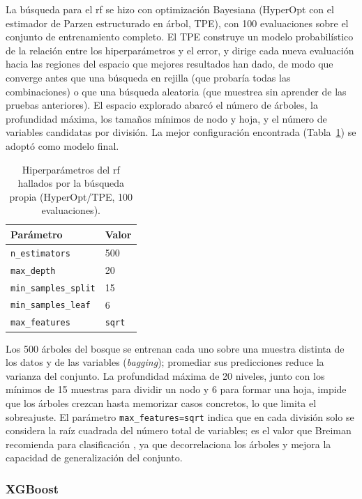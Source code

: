 La búsqueda para el \acrlong{rf} se hizo con optimización Bayesiana (HyperOpt con el estimador de Parzen estructurado en árbol, TPE), con 100 evaluaciones sobre el conjunto de entrenamiento completo. El TPE construye un modelo probabilístico de la relación entre los hiperparámetros y el error, y dirige cada nueva evaluación hacia las regiones del espacio que mejores resultados han dado, de modo que converge antes que una búsqueda en rejilla (que probaría todas las combinaciones) o que una búsqueda aleatoria (que muestrea sin aprender de las pruebas anteriores). El espacio explorado abarcó el número de árboles, la profundidad máxima, los tamaños mínimos de nodo y hoja, y el número de variables candidatas por división. La mejor configuración encontrada (Tabla~\ref{tab:rf_params}) se adoptó como modelo final.

\begin{table}[htbp]
  \caption{Hiperparámetros del \acrlong{rf} hallados por la búsqueda propia (HyperOpt/TPE, 100 evaluaciones).}
  \label{tab:rf_params}
  \centering
  \begin{tabular}{ll}
    \toprule
    \textbf{Parámetro} & \textbf{Valor} \\
    \midrule
    \texttt{n\_estimators}      & 500 \\
    \texttt{max\_depth}         & 20 \\
    \texttt{min\_samples\_split} & 15 \\
    \texttt{min\_samples\_leaf} & 6 \\
    \texttt{max\_features}      & \texttt{sqrt} \\
    \bottomrule
  \end{tabular}
\end{table}

Los 500 árboles del bosque se entrenan cada uno sobre una muestra distinta de los datos y de las variables (\textit{bagging}); promediar sus predicciones reduce la varianza del conjunto. La profundidad máxima de 20 niveles, junto con los mínimos de 15 muestras para dividir un nodo y 6 para formar una hoja, impide que los árboles crezcan hasta memorizar casos concretos, lo que limita el sobreajuste. El parámetro \texttt{max\_features=sqrt} indica que en cada división solo se considera la raíz cuadrada del número total de variables; es el valor que Breiman recomienda para clasificación \cite{Breiman2001}, ya que decorrelaciona los árboles y mejora la capacidad de generalización del conjunto.

\newpage
\subsubsection*{XGBoost}

